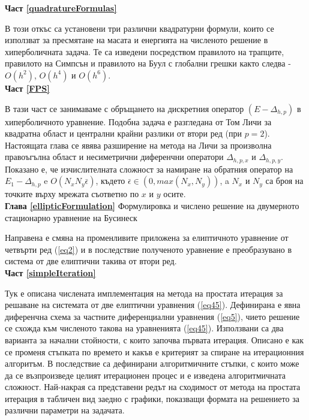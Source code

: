 \documentclass[a4paper]{article}
\newcommand{\rf}[1]{(\ref{#1})}
\theoremstyle{remark}
\begin{document}
\begin{large}
\textbf{Част \ref{quadratureFormulas}} 

В този откъс са установени три различни квадратурни формули, които се използват за пресмятане на масата и енергията на численото решение в хиперболичната задача. Те са изведени посредством правилото на трапците, правилото на  Симпсън и правилото на Буул с глобални грешки както следва - $O(h^2)$, $O(h^4)$ и $O(h^6)$.\\

\textbf{Част \ref{FPS}}

В тази част се занимаваме с обръщането на дискретния оператор $(E-\Delta_{h,p})$ в хиперболичното уравнение. Подобна задача е разгледана от Том Личи \cite{ref34} за квадратна област и централни крайни разлики от втори ред (при $p=2$). Настоящата глава се явява разширение на метода на Личи за произволна правоъгълна област и несиметрични диференчни оператори $\Delta_{h,p,x}$ и $\Delta_{h,p,y}$. Показано е, че изчислителната сложност за намиране на обратния оператор на $E_1 - \Delta_{h,p}$ e $O(N_x N_y \bar{\epsilon})$, където $\bar{\epsilon} \in (0, max(N_x, N_y))$, a $N_x$ и $N_y$ са броя на точките върху мрежата съответно по $x$ и $y$ осите.\\

\textbf{Глава \ref{ellipticFormulation}} Формулировка и числено решение на двумерното стационарно уравнение на Бусинеск

Направена е смяна на променливите приложена за елиптичното уравнение от четвърти ред \rf{eq2} и в последствие полученото уравнение е преобразувано в система от две елиптични такива от втори ред. \\

\textbf{Част \ref{simpleIteration}}

Тук е описана числената имплементация на метода на простата итерация за решаване на системата от две елиптични уравнения \rf{eq45}. Дефинирана е явна диференчна схема за частните диференциални уравнения \rf{eq5}, чието решение се схожда към численото такова на уравненията \rf{eq45}. Използвани са два варианта за начални стойности, с които започва първата итерация. Описано е как се променя стъпката по времето и какъв е критерият за спиране на итерационния алгоритъм. В последствие са дефинирани алгоритмичните стъпки, с които може да се възпроизведе целият итерационен процес и е изведена алгоритмичната сложност. Най-накрая са представени редът на сходимост от метода на простата итерация в табличен вид заедно с графики, показващи формата на решението за различни параметри на задачата. \\


\end{large}
\end{document}
